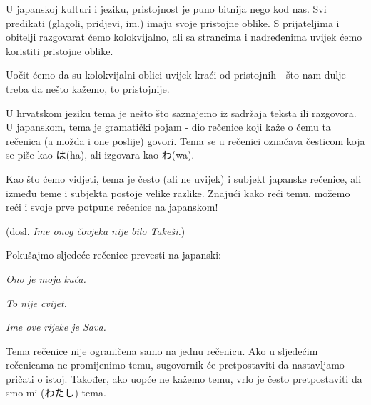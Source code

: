 	
	U japanskoj kulturi i jeziku, pristojnost je puno bitnija nego kod nas. Svi predikati (glagoli, pridjevi, im.) imaju svoje pristojne oblike. S prijateljima i obitelji razgovarat ćemo kolokvijalno, ali sa strancima i nadređenima uvijek ćemo koristiti pristojne oblike.
	
	Uočit ćemo da su kolokvijalni oblici uvijek kraći od pristojnih - što nam dulje treba da nešto kažemo, to pristojnije.
	
	
	U hrvatskom jeziku tema je nešto što saznajemo iz sadržaja teksta ili razgovora. U japanskom, tema je gramatički pojam - dio rečenice koji kaže o čemu ta rečenica (a možda i one poslije) govori. Tema se u rečenici označava česticom koja se piše kao は(ha), ali izgovara kao わ(wa)\footnotemark[2].
	
	
	Kao što ćemo vidjeti, tema je često (ali ne uvijek) i subjekt japanske rečenice, ali između teme i subjekta postoje velike razlike. Znajući kako reći temu, možemo reći i svoje prve potpune rečenice na japanskom!
	
	\begin{reibun}
		 (dosl. \textit{Ime onog čovjeka nije bilo Takeši.})
	\end{reibun}

	\begin{mondai}{Pokušajmo sljedeće rečenice prevesti na japanski:}
		\item \textit{Ono je moja kuća.}
		\item \textit{To nije cvijet.}
		\item \textit{Ime ove rijeke je Sava.}
	\end{mondai}

	Tema rečenice nije ograničena samo na jednu rečenicu. Ako u sljedećim rečenicama ne promijenimo temu, sugovornik će pretpostaviti da nastavljamo pričati o istoj. Također, ako uopće ne kažemo temu, vrlo je često pretpostaviti da smo mi (わたし) tema.

